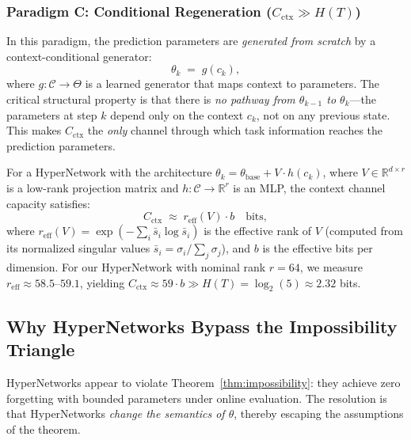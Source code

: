 \documentclass{article}
\begin{document}
\subsubsection{Paradigm C: Conditional Regeneration ($C_\mathrm{ctx} \gg H(T)$)}
\label{sec:paradigm_c}

In this paradigm, the prediction parameters are \emph{generated from scratch} by a context-conditional generator:
\begin{equation}
\label{eq:paradigm_c}
    \theta_k \;=\; g(c_k),
\end{equation}
where $g: \mathcal{C} \to \Theta$ is a learned generator that maps context to parameters. The critical structural property is that there is \emph{no pathway from $\theta_{k-1}$ to $\theta_k$}---the parameters at step $k$ depend only on the context $c_k$, not on any previous state. This makes $C_\mathrm{ctx}$ the \emph{only} channel through which task information reaches the prediction parameters.

For a HyperNetwork with the architecture $\theta_k = \theta_\mathrm{base} + V \cdot h(c_k)$, where $V \in \mathbb{R}^{d \times r}$ is a low-rank projection matrix and $h: \mathcal{C} \to \mathbb{R}^r$ is an MLP, the context channel capacity satisfies:
\begin{equation}
\label{eq:cctx_hypernet}
    C_\mathrm{ctx} \;\approx\; r_\mathrm{eff}(V) \cdot b \quad \text{bits},
\end{equation}
where $r_\mathrm{eff}(V) = \exp\!\left(-\sum_i \bar{s}_i \log \bar{s}_i\right)$ is the effective rank of $V$ (computed from its normalized singular values $\bar{s}_i = \sigma_i / \sum_j \sigma_j$), and $b$ is the effective bits per dimension. For our HyperNetwork with nominal rank $r = 64$, we measure $r_\mathrm{eff} \approx 58.5$--$59.1$, yielding $C_\mathrm{ctx} \approx 59 \cdot b \gg H(T) = \log_2(5) \approx 2.32$ bits.


\subsection{Why HyperNetworks Bypass the Impossibility Triangle}
\label{sec:hypernet_bypass}

HyperNetworks \citep{von2019continual} appear to violate Theorem~\ref{thm:impossibility}: they achieve zero forgetting with bounded parameters under online evaluation. The resolution is that HyperNetworks \emph{change the semantics of $\theta$}, thereby escaping the assumptions of the theorem.
\end{document}
